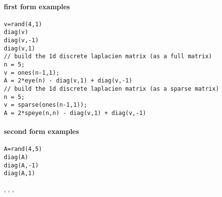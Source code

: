 \begin{examples}
\paragraph{first form examples}
\begin{Verbatim}
v=rand(4,1) 
diag(v) 
diag(v,-1) 
diag(v,1)
// build the 1d discrete laplacien matrix (as a full matrix)
n = 5;
v = ones(n-1,1);
A = 2*eye(n) - diag(v,1) + diag(v,-1)
// build the 1d discrete laplacien matrix (as a sparse matrix)
n = 5;
v = sparse(ones(n-1,1));
A = 2*speye(n,n) - diag(v,1) + diag(v,-1)
\end{Verbatim}

\paragraph{second form examples}
\begin{Verbatim}
A=rand(4,5) 
diag(A) 
diag(A,-1) 
diag(A,1)
\end{Verbatim}
\end{examples}

\begin{manseealso}
 , , , 
\end{manseealso}


